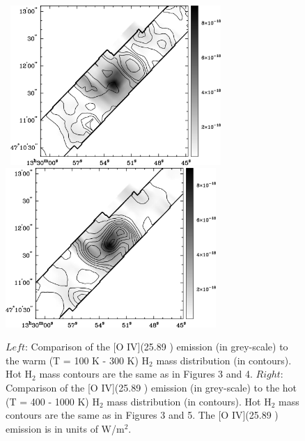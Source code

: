 \documentclass[manuscript]{aastex}
\begin{document}
\begin{figure}[!h]
\centerline{\hbox{ \hspace{0.0in} 
\includegraphics[width=8cm,angle=0]{oiv_v_warm_paper.jpg}
\hspace{0.1in}
\includegraphics[width=8cm,angle=0]{oiv_v_hot_paper.jpg}}}
\caption{$Left$:  Comparison of the [O IV](25.89 \micron) emission (in grey-scale) to the warm (T = 100 K - 300 K) $\mathrm{H_2}$ mass distribution (in contours).  Hot $\mathrm{H_2}$ mass contours are the same as in Figures 3 and 4.  $Right$: Comparison of the [O IV](25.89 \micron) emission (in grey-scale) to the hot (T = 400 - 1000 K) $\mathrm{H_2}$ mass distribution (in contours).  Hot $\mathrm{H_2}$ mass contours are the same as in Figures 3 and 5.  The [O IV](25.89 \micron) emission is in units of W/$\mathrm{m^2}$.\label{fig9}}
\end{figure}

\clearpage
\end{document}

